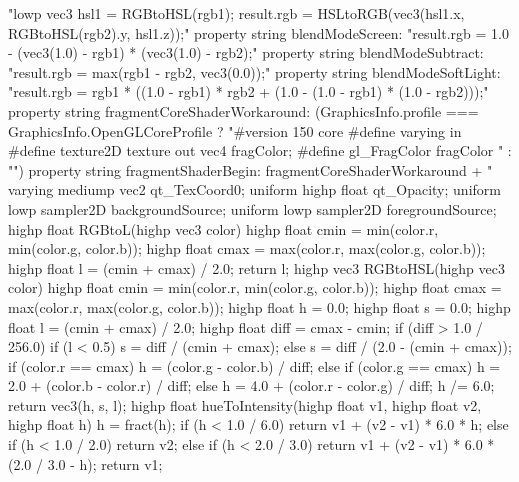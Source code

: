 \begin{thebookfilesourceone}[escapeinside={(*@}{@*)},
caption=GoodLuck,
title=\filesourcenumbernameone \thefilesourcenumber
]
{{        "lowp vec3 hsl1 = RGBtoHSL(rgb1); result.rgb = HSLtoRGB(vec3(hsl1.x, RGBtoHSL(rgb2).y, hsl1.z));"
        property string blendModeScreen:
        "result.rgb = 1.0 - (vec3(1.0) - rgb1) * (vec3(1.0) - rgb2);"
        property string blendModeSubtract: "result.rgb = max(rgb1 - rgb2, vec3(0.0));"
        property string blendModeSoftLight:
        "result.rgb = rgb1 * ((1.0 - rgb1) * rgb2 + (1.0 - (1.0 - rgb1) * (1.0 - rgb2)));"
        property string fragmentCoreShaderWorkaround:
        (GraphicsInfo.profile === GraphicsInfo.OpenGLCoreProfile ?
           "#version 150 core
            #define varying in
            #define texture2D texture
            out vec4 fragColor;
            #define gl_FragColor fragColor " : "")
        property string fragmentShaderBegin: fragmentCoreShaderWorkaround + "
            varying mediump vec2 qt_TexCoord0;
            uniform highp float qt_Opacity;
            uniform lowp sampler2D backgroundSource;
            uniform lowp sampler2D foregroundSource;
            highp float RGBtoL(highp vec3 color) {
                highp float cmin = min(color.r, min(color.g, color.b));
                highp float cmax = max(color.r, max(color.g, color.b));
                highp float l = (cmin + cmax) / 2.0;
                return l; }
            highp vec3 RGBtoHSL(highp vec3 color) {
                highp float cmin = min(color.r, min(color.g, color.b));
                highp float cmax = max(color.r, max(color.g, color.b));
                highp float h = 0.0;
                highp float s = 0.0;
                highp float l = (cmin + cmax) / 2.0;
                highp float diff = cmax - cmin;
                if (diff > 1.0 / 256.0) {
                    if (l < 0.5) { s = diff / (cmin + cmax); }
                    else { s = diff / (2.0 - (cmin + cmax)); }
                    if (color.r == cmax) {
                        h = (color.g - color.b) / diff; }
                    else if (color.g == cmax) {
                        h = 2.0 + (color.b - color.r) / diff; }
                    else {
                        h = 4.0 + (color.r - color.g) / diff; }
                    h /= 6.0; }
                return vec3(h, s, l); }
            highp float hueToIntensity(highp float v1, highp float v2, highp float h) {
                h = fract(h);
                if (h < 1.0 / 6.0) {
                    return v1 + (v2 - v1) * 6.0 * h; }
                else if (h < 1.0 / 2.0) { return v2; }
                else if (h < 2.0 / 3.0) {
                    return v1 + (v2 - v1) * 6.0 * (2.0 / 3.0 - h); }
                return v1; }
}}
\end{thebookfilesourceone}
